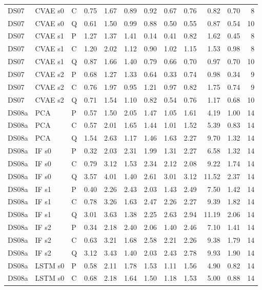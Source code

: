 \documentclass[10pt]{article}
\begin{document}
{\begin{longtable}{lllrrrrrrrrr}
DS07 & CVAE s0 & C & 0.75 & 1.67 & 0.89 & 0.92 & 0.67 & 0.76 & 0.82 & 0.70 & 8 \\
DS07 & CVAE s0 & Q & 0.61 & 1.50 & 0.99 & 0.88 & 0.50 & 0.55 & 0.87 & 0.54 & 10 \\
DS07 & CVAE s1 & P & 1.27 & 1.37 & 1.41 & 0.14 & 0.41 & 0.82 & 1.62 & 0.45 & 8 \\
DS07 & CVAE s1 & C & 1.20 & 2.02 & 1.12 & 0.90 & 1.02 & 1.15 & 1.53 & 0.98 & 8 \\
DS07 & CVAE s1 & Q & 0.87 & 1.66 & 1.40 & 0.79 & 0.66 & 0.70 & 0.97 & 0.70 & 10 \\
DS07 & CVAE s2 & P & 0.68 & 1.27 & 1.33 & 0.64 & 0.33 & 0.74 & 0.98 & 0.34 & 9 \\
DS07 & CVAE s2 & C & 0.76 & 1.97 & 0.95 & 1.21 & 0.97 & 0.82 & 1.75 & 0.74 & 9 \\
DS07 & CVAE s2 & Q & 0.71 & 1.54 & 1.10 & 0.82 & 0.54 & 0.76 & 1.17 & 0.68 & 10 \\
\midrule
DS08a & PCA & P & 0.57 & 1.50 & 2.05 & 1.47 & 1.05 & 1.61 & 4.19 & 1.00 & 14 \\
DS08a & PCA & C & 0.57 & 2.01 & 1.65 & 1.44 & 1.01 & 1.52 & 5.39 & 0.83 & 14 \\
DS08a & PCA & Q & 1.54 & 2.63 & 1.17 & 1.46 & 1.63 & 2.27 & 9.70 & 1.32 & 14 \\
DS08a & IF s0 & P & 0.32 & 2.03 & 2.31 & 1.99 & 1.31 & 2.27 & 6.58 & 1.32 & 14 \\
DS08a & IF s0 & C & 0.79 & 3.12 & 1.53 & 2.34 & 2.12 & 2.08 & 9.22 & 1.74 & 14 \\
DS08a & IF s0 & Q & 3.57 & 4.01 & 1.40 & 2.61 & 3.01 & 3.12 & 11.52 & 2.37 & 14 \\
DS08a & IF s1 & P & 0.40 & 2.26 & 2.43 & 2.03 & 1.43 & 2.49 & 7.50 & 1.42 & 14 \\
DS08a & IF s1 & C & 0.78 & 3.26 & 1.63 & 2.47 & 2.26 & 2.27 & 9.39 & 1.82 & 14 \\
DS08a & IF s1 & Q & 3.01 & 3.63 & 1.38 & 2.25 & 2.63 & 2.94 & 11.19 & 2.06 & 14 \\
DS08a & IF s2 & P & 0.34 & 2.18 & 2.40 & 2.06 & 1.40 & 2.46 & 7.10 & 1.41 & 14 \\
DS08a & IF s2 & C & 0.63 & 3.21 & 1.68 & 2.58 & 2.21 & 2.26 & 9.38 & 1.79 & 14 \\
DS08a & IF s2 & Q & 3.12 & 3.43 & 1.40 & 2.03 & 2.43 & 2.78 & 9.93 & 1.90 & 14 \\
DS08a & LSTM s0 & P & 0.58 & 2.11 & 1.78 & 1.53 & 1.11 & 1.56 & 4.90 & 0.82 & 14 \\
DS08a & LSTM s0 & C & 0.68 & 2.18 & 1.64 & 1.50 & 1.18 & 1.53 & 5.00 & 0.88 & 14 \\

\end{longtable}}
\end{document}

